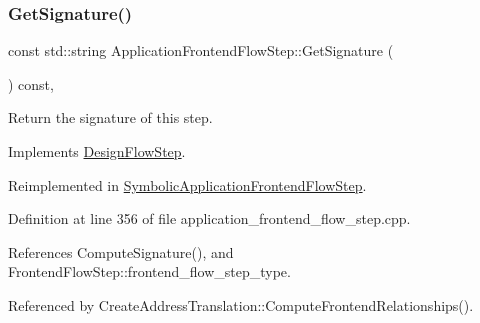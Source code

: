 \subsubsection{\texorpdfstring{Get\+Signature()}{GetSignature()}}
{\footnotesize\ttfamily const std\+::string Application\+Frontend\+Flow\+Step\+::\+Get\+Signature (\begin{DoxyParamCaption}{ }\end{DoxyParamCaption}) const\hspace{0.3cm}{\ttfamily [override]}, {\ttfamily [virtual]}}



Return the signature of this step. 



Implements \hyperlink{classDesignFlowStep_ab111e3d4058615c2dedc0505978d4699}{Design\+Flow\+Step}.



Reimplemented in \hyperlink{classSymbolicApplicationFrontendFlowStep_a556a719569a45bfc5f3554c1cc7558c3}{Symbolic\+Application\+Frontend\+Flow\+Step}.



Definition at line 356 of file application\+\_\+frontend\+\_\+flow\+\_\+step.\+cpp.



References Compute\+Signature(), and Frontend\+Flow\+Step\+::frontend\+\_\+flow\+\_\+step\+\_\+type.



Referenced by Create\+Address\+Translation\+::\+Compute\+Frontend\+Relationships().

